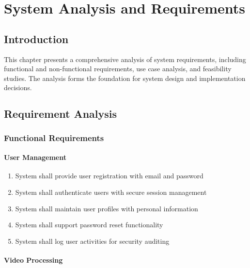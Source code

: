\chapter{System Analysis and Requirements}

\section{Introduction}

This chapter presents a comprehensive analysis of system requirements, including functional and non-functional requirements, use case analysis, and feasibility studies. The analysis forms the foundation for system design and implementation decisions.

\section{Requirement Analysis}

\subsection{Functional Requirements}

\subsubsection{User Management}

\begin{enumerate}[label=FR1.\arabic*]
    \item System shall provide user registration with email and password
    \item System shall authenticate users with secure session management
    \item System shall maintain user profiles with personal information
    \item System shall support password reset functionality
    \item System shall log user activities for security auditing
\end{enumerate}

\subsubsection{Video Processing}

